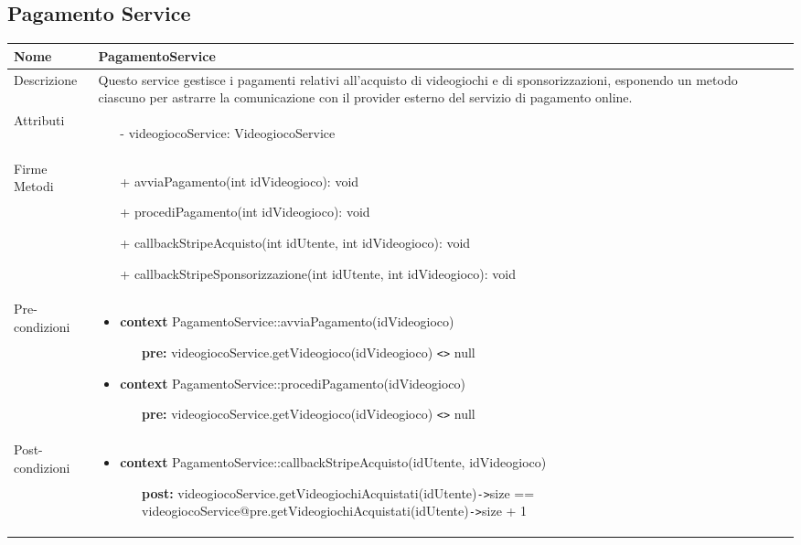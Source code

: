 \subsection{Pagamento Service}
\small\begin{tabular}{|| l | p{28em} ||} 
	\hline
	Nome & PagamentoService\\
	\hline
	Descrizione & Questo service gestisce i pagamenti relativi all'acquisto di videogiochi e di sponsorizzazioni, esponendo un metodo ciascuno per astrarre la comunicazione con il provider esterno del servizio di pagamento online. \\
	\hline
	Attributi & \begin{itemize}
		\item[-] videogiocoService: VideogiocoService
	\end{itemize}\\
	\hline
	Firme Metodi & \begin{itemize}
		\item[+] avviaPagamento(int idVideogioco): void 
		\item[+] procediPagamento(int idVideogioco): void
		\item[+] callbackStripeAcquisto(int idUtente, int idVideogioco): void  
		\item[+] callbackStripeSponsorizzazione(int idUtente, int idVideogioco): void
	\end{itemize}\\
	\hline
	Pre-condizioni & \begin{itemize}[leftmargin=*]
		\item \textbf{context} PagamentoService::avviaPagamento(idVideogioco)
		\begin{itemize}
			\item[ ] \textbf{pre:} videogiocoService.getVideogioco(idVideogioco) \verb|<>| null
		\end{itemize}

		\item \textbf{context} PagamentoService::procediPagamento(idVideogioco)
		\begin{itemize}
			\item[ ] \textbf{pre:} videogiocoService.getVideogioco(idVideogioco) \verb|<>| null
		\end{itemize}
	\end{itemize}\\
	\hline
	Post-condizioni & \begin{itemize}[leftmargin=*]
		\item \textbf{context} PagamentoService::callbackStripeAcquisto(idUtente, idVideogioco)
		\begin{itemize}
			\item[ ] \textbf{post:} videogiocoService\newline .getVideogiochiAcquistati(idUtente)\verb|->|size == videogiocoService\newline @pre.getVideogiochiAcquistati(idUtente)\verb|->|size + 1
		\end{itemize}


\end{itemize}
\end{tabular}
